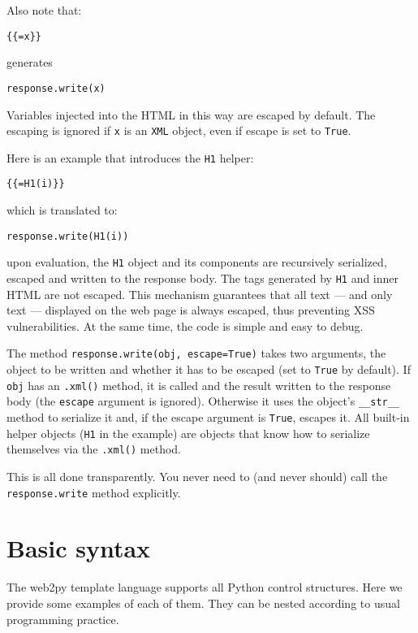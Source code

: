 \documentclass[justified,sixbynine,notoc]{tufte-book}
\def\ft{\small\tt}
\def\inxx#1{\index{#1}}
\begin{document}
\begin{fullwidth}
Also note that:
\begin{lstlisting}[keywords={}]
{{=x}}
\end{lstlisting}
\noindent generates
\inxx{response.write} \inxx{escape}
\begin{lstlisting}
response.write(x)
\end{lstlisting}

Variables injected into the HTML in this way are escaped by default.
The escaping is ignored if {\ft x} is an {\ft XML} object, even if escape is set to {\ft True}.

Here is an example that introduces the {\ft H1} helper:
\begin{lstlisting}[keywords={}]
{{=H1(i)}}
\end{lstlisting}
\noindent which is translated to:
\begin{lstlisting}
response.write(H1(i))
\end{lstlisting}
\noindent upon evaluation, the {\ft H1} object and its components are recursively serialized, escaped and written to the response body. The tags generated by {\ft H1} and inner HTML are not escaped. This mechanism guarantees that all text --- and only text --- displayed on the web page is always escaped, thus preventing XSS vulnerabilities. At the same time, the code is simple and easy to debug.

The method {\ft response.write(obj, escape=True)} takes two arguments, the object to be written and whether it has to be escaped (set to {\ft True} by default). If {\ft obj} has an {\ft .xml()} method, it is called and the result written to the response body (the {\ft escape} argument is ignored). Otherwise it uses the object's {\ft \_\_str\_\_} method to serialize it and, if the escape argument is {\ft True}, escapes it. All built-in helper objects ({\ft H1} in the example) are objects that know how to serialize themselves via the {\ft .xml()} method.

This is all done transparently. You never need to (and never should) call the {\ft response.write} method explicitly.

\goodbreak\section{Basic syntax}

The web2py template language supports all Python control structures. Here we provide some examples of each of them. They can be nested according to usual programming practice.


\end{fullwidth}
\end{document}
